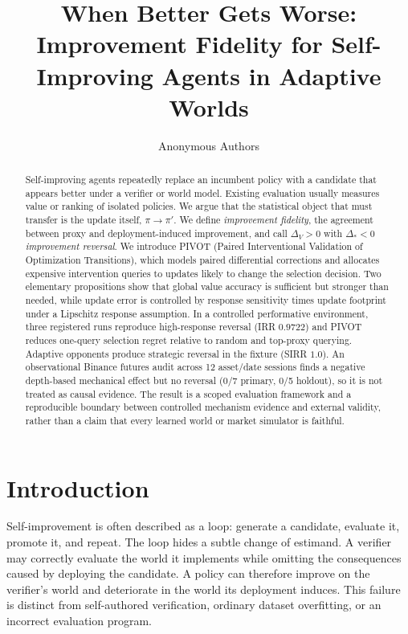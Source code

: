 \documentclass[10pt,twocolumn]{article}
\title{When Better Gets Worse: Improvement Fidelity for Self-Improving Agents in Adaptive Worlds}
\author{Anonymous Authors}
\date{}
\newcommand{\dproxy}{\Delta_V}
\newcommand{\dtrue}{\Delta_*}
\begin{document}
\maketitle

\begin{abstract}
Self-improving agents repeatedly replace an incumbent policy with a candidate
that appears better under a verifier or world model. Existing evaluation
usually measures value or ranking of isolated policies. We argue that the
statistical object that must transfer is the update itself, $\pi\!\to\!\pi'$.
We define \emph{improvement fidelity}, the agreement between proxy and
deployment-induced improvement, and call $\dproxy>0$ with $\dtrue<0$
\emph{improvement reversal}. We introduce PIVOT (Paired Interventional
Validation of Optimization Transitions), which models paired differential
corrections and allocates expensive intervention queries to updates likely to
change the selection decision. Two elementary propositions show that global
value accuracy is sufficient but stronger than needed, while update error is
controlled by response sensitivity times update footprint under a Lipschitz
response assumption. In a controlled performative environment, three
registered runs reproduce high-response reversal (IRR $0.9722$) and PIVOT
reduces one-query selection regret relative to random and top-proxy querying.
Adaptive opponents produce strategic reversal in the fixture (SIRR $1.0$).
An observational Binance futures audit across 12 asset/date sessions finds a
negative depth-based mechanical effect but no reversal (0/7 primary, 0/5
holdout), so it is not treated as causal evidence. The result is a scoped
evaluation framework and a reproducible boundary between controlled mechanism
evidence and external validity, rather than a claim that every learned world
or market simulator is faithful.
\end{abstract}

\section{Introduction}
Self-improvement is often described as a loop: generate a candidate, evaluate
it, promote it, and repeat. The loop hides a subtle change of estimand. A
verifier may correctly evaluate the world it implements while omitting the
consequences caused by deploying the candidate. A policy can therefore improve
on the verifier's world and deteriorate in the world its deployment induces.
This failure is distinct from self-authored verification, ordinary dataset
overfitting, or an incorrect evaluation program.
\end{document}
